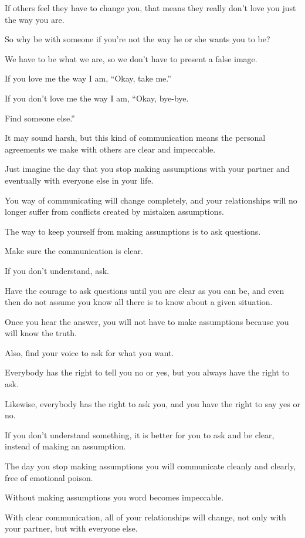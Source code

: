 \documentclass{article}
\numberwithin{equation}{section}
\begin{document}
If others feel they have to change you, that means they really don't love you just the way you are.

So why be with someone if you're not the way he or she wants you to be?

%
We have to be what we are, so we don't have to present a false image.

If you love me the way I am, ``Okay, take me.''

If you don't love me the way I am, ``Okay, bye-bye.

Find someone else.''

It may sound harsh, but this kind of communication means the personal agreements we make with others are clear and impeccable.

%
Just imagine the day that you stop making assumptions with your partner and eventually with everyone else in your life.

You way of communicating will change completely, and your relationships will no longer suffer from conflicts created by mistaken assumptions.

%
The way to keep yourself from making assumptions is to ask questions.

Make sure the communication is clear.

If you don't understand, ask.

Have the courage to ask questions until you are clear as you can be, and even then do not assume you know all there is to know about a given situation.

Once you hear the answer, you will not have to make assumptions because you will know the truth.

%
Also, find your voice to ask for what you want.

Everybody has the right to tell you no or yes, but you always have the right to ask.

Likewise, everybody has the right to ask you, and you have the right to say yes or no.

%
If you don't understand something, it is better for you to ask and be clear, instead of making an assumption.

The day you stop making assumptions you will communicate cleanly and clearly, free of emotional poison.

Without making assumptions you word becomes impeccable.

%
With clear communication, all of your relationships will change, not only with your partner, but with everyone else.
\end{document}
